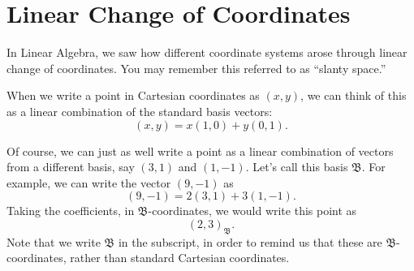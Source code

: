 \documentclass{ximera}
\begin{document}
\section{Linear Change of Coordinates}

In Linear Algebra, we saw how different coordinate systems arose through linear change of coordinates. You may remember this referred to as ``slanty space.''

When we write a point in Cartesian coordinates as $(x,y)$, we can think of this as a linear combination of the standard basis vectors:
\[
(x,y) = x(1,0) + y(0,1).
\]

Of course, we can just as well write a point as a linear combination of vectors from a different basis, say $(3,1)$ and $(1, -1)$. Let's call this basis $\mathfrak{B}$. For example, we can write the vector $(9,-1)$ as
\[
(9,-1) = 2(3,1)+3(1,-1).
\]
Taking the coefficients, in $\mathfrak{B}$-coordinates, we would write this point as
\[
(2,3)_{\mathfrak{B}}.
\]
Note that we write $\mathfrak{B}$ in the subscript, in order to remind us that these are $\mathfrak{B}$-coordinates, rather than standard Cartesian coordinates.

\begin{image}
\end{image}
\end{document}
